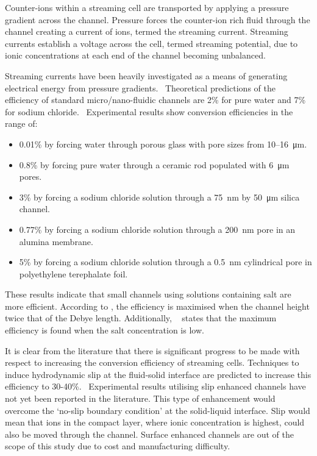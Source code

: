 \documentclass[10pt,final,journal]{IEEEtran}
\begin{document}
        Counter-ions within a streaming cell are transported by applying a pressure gradient across the channel.
        Pressure forces the counter-ion rich fluid through the channel creating a current of ions, termed the streaming current.
        Streaming currents establish a voltage across the cell, termed streaming potential, due to ionic concentrations at each end of the channel becoming unbalanced.

        Streaming currents have been heavily investigated as a means of generating electrical energy from pressure gradients.~\cite{Chang2009,Daiguji2006,Daiguji2004b,Davidson2008a,Davidson2008,CherngHon2012,Jiao2014,Lu2006,Olthuis2005,Osterle1964,Pennathur2007,Ren2008a,VanderHeyden2006,Heyden2007,Xie2008,Yang2003}
        Theoretical predictions of the efficiency of standard micro/nano-fluidic channels are 2\% for pure water and 7\% for sodium chloride.~\cite{VanderHeyden2006}
        Experimental results show conversion efficiencies in the range of:
        \begin{itemize}
            \item 0.01\% by forcing water through porous glass with pore sizes from 10\thinspace--\SI{16}{\micro\metre}.~\cite{Yang2003}
            \item 0.8\% by forcing pure water through a ceramic rod populated with \SI{6}{\micro\metre} pores.~\cite{Yang2004}
            \item 3\% by forcing a sodium chloride solution through a \SI{75}{\nano\metre} by \SI{50}{\micro\metre} silica channel.~\cite{Heyden2007}
            \item 0.77\% by forcing a sodium chloride solution through a \SI{200}{\nano\metre} pore in an alumina membrane.~\cite{Lu2006}
            \item 5\% by forcing a sodium chloride solution through a \SI{0.5}{\nano\metre} cylindrical pore in polyethylene terephalate foil.~\cite{Xie2008}
        \end{itemize}
        These results indicate that small channels using solutions containing salt are more efficient.
        According to \cite{Daiguji2004b}, the efficiency is maximised when the channel height twice that of the Debye length.
        Additionally, ~\cite{VanderHeyden2006} states that the maximum efficiency is found when the salt concentration is low.


        It is clear from the literature that there is significant progress to be made with respect to increasing the conversion efficiency of streaming cells.
        Techniques to induce hydrodynamic slip at the fluid-solid interface are predicted to increase this efficiency to 30-40\%.~\cite{Davidson2008a, Ren2008a}
        Experimental results utilising slip enhanced channels have not yet been reported in the literature.
        This type of enhancement would overcome the `no-slip boundary condition' at the solid-liquid interface.
        Slip would mean that ions in the compact layer, where ionic concentration is highest, could also be moved through the channel.
        Surface enhanced channels are out of the scope of this study due to cost and manufacturing difficulty.
\end{document}
